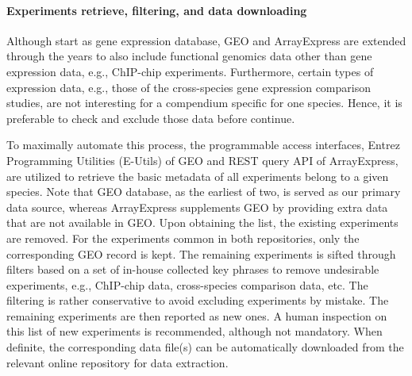 






\paragraph{Experiments retrieve, filtering, and data downloading}

Although start as gene expression database, GEO and ArrayExpress are
extended through the years to also include functional genomics data
other than gene expression data, e.g., ChIP-chip experiments.
%
Furthermore, certain types of expression data, e.g., those of the
cross-species gene expression comparison studies, are not interesting
for a compendium specific for one species.
%
Hence, it is preferable to check and exclude those data before
continue.

To maximally automate this process, the programmable access interfaces,
Entrez Programming Utilities (E-Utils) of GEO and REST query API of
ArrayExpress, are utilized to retrieve the basic metadata of all
experiments belong to a given species.
%
Note that GEO database, as the earliest of two, is served as our primary
data source, whereas ArrayExpress supplements GEO by providing extra data
that are not available in GEO.
%
Upon obtaining the list, the existing experiments are removed.  For the
experiments common in both repositories, only the corresponding GEO record
is kept.
%
The remaining experiments is sifted through filters based on a set of
in-house collected key phrases to remove undesirable experiments, e.g.,
ChIP-chip data, cross-species comparison data, etc.
%
The filtering is rather conservative to avoid excluding experiments by
mistake.
%
The remaining experiments are then reported as new ones.  A human
inspection on this list of new experiments is recommended, although
not mandatory. 
%
When definite, the corresponding data file(s) can be automatically
downloaded from the relevant online repository for data extraction.

